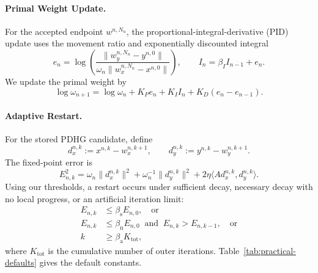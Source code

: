 \documentclass[letterpaper]{article} %
\theoremstyle{definition}
\theoremstyle{remark}
\begin{document}
\paragraph{Primal Weight Update.}
For the accepted endpoint $w^{n,N_n}$, the proportional-integral-derivative
(PID) update uses the movement ratio and exponentially discounted integral
\begin{equation}
\label{eq:pid-error}
    e_n
    =
    \log\left(
        \frac{\|w_y^{n,N_n}-y^{n,0}\|}
        {\omega_n\|w_x^{n,N_n}-x^{n,0}\|}
    \right),
    \qquad
    I_n=\beta_I I_{n-1}+e_n.
\end{equation}
We update the primal weight by
\begin{equation}
\label{eq:pid-weight}
    \log\omega_{n+1}
    =
    \log\omega_n
    +K_Pe_n+K_I I_n+K_D(e_n-e_{n-1}).
\end{equation}

\paragraph{Adaptive Restart.}
For the stored PDHG candidate, define
\[
    d_x^{n,k}:=x^{n,k}-w_x^{n,k+1},
    \qquad
    d_y^{n,k}:=y^{n,k}-w_y^{n,k+1}.
\]
The fixed-point error is
\begin{equation}
\label{eq:practical-fixed-point-movement}
    E_{n,k}^2
    =
    \omega_n\|d_x^{n,k}\|^2
    +\omega_n^{-1}\|d_y^{n,k}\|^2
    +2\eta\langle A d_x^{n,k},d_y^{n,k}\rangle.
\end{equation}
Using our thresholds, a restart occurs under sufficient decay,
necessary decay with no local progress, or an artificial iteration limit:
\begin{equation}
\label{eq:practical-restart-rule}
\begin{aligned}
    E_{n,k}&\le\beta_{\mathrm{s}}E_{n,0},
    \quad\text{or}\\
    E_{n,k}&\le\beta_{\mathrm{n}}E_{n,0}
        \ \text{ and }\ E_{n,k}>E_{n,k-1},
    \quad\text{or}\\
    k&\ge\beta_{\mathrm{a}}K_{\mathrm{tot}},
\end{aligned}
\end{equation}
where $K_{\mathrm{tot}}$ is the cumulative number of outer iterations.
Table~\ref{tab:practical-defaults} gives the default constants.
\end{document}
